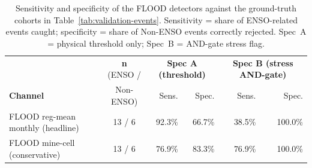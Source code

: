 \begin{table}[H]
\centering
\caption{Sensitivity and specificity of the FLOOD detectors against the ground-truth cohorts in Table~\ref{tab:validation-events}. Sensitivity = share of ENSO-related events caught; specificity = share of Non-ENSO events correctly rejected. Spec~A = physical threshold only; Spec~B = AND-gate stress flag.}
\label{tab:validation-summary}
\small
\begin{tabular}{p{5.0cm}c rr rr}
\toprule
& \textbf{n} (ENSO / & \multicolumn{2}{c}{\textbf{Spec A (threshold)}} & \multicolumn{2}{c}{\textbf{Spec B (stress AND-gate)}} \\
\textbf{Channel} & Non-ENSO) & Sens. & Spec. & Sens. & Spec. \\
\midrule
FLOOD reg-mean monthly (headline) & 13 / 6 & 92.3\% & 66.7\% & 38.5\% & 100.0\% \\
FLOOD mine-cell (conservative) & 13 / 6 & 76.9\% & 83.3\% & 76.9\% & 100.0\% \\
\bottomrule
\end{tabular}
\end{table}


